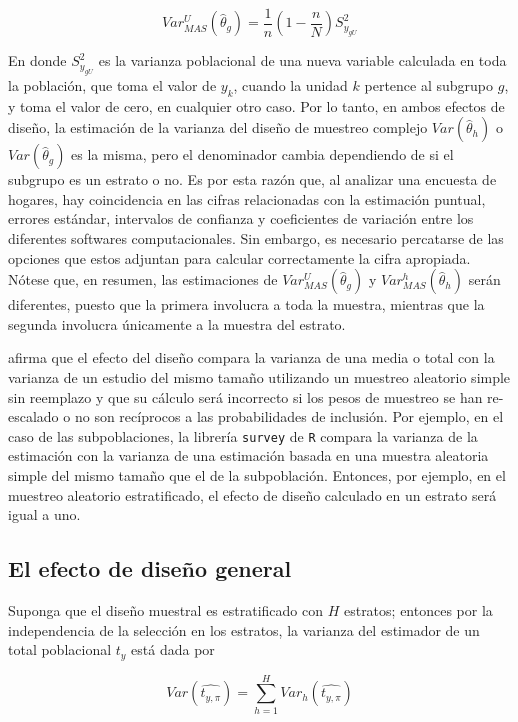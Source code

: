 \documentclass[
  12pt,
]{book}
\begin{document}
\[
Var_{MAS}^U(\hat\theta_g)=\frac{1}{n}\left(1-\frac{n}{N}\right)S^2_{y_{gU}}
\]

En donde \(S^2_{y_{gU}}\) es la varianza poblacional de una nueva variable calculada en toda la población, que toma el valor de \(y_k\), cuando la unidad \(k\) pertence al subgrupo \(g\), y toma el valor de cero, en cualquier otro caso. Por lo tanto, en ambos efectos de diseño, la estimación de la varianza del diseño de muestreo complejo \(Var (\hat\theta_h)\) o \(Var (\hat\theta_g)\) es la misma, pero el denominador cambia dependiendo de si el subgrupo es un estrato o no. Es por esta razón que, al analizar una encuesta de hogares, hay coincidencia en las cifras relacionadas con la estimación puntual, errores estándar, intervalos de confianza y coeficientes de variación entre los diferentes softwares computacionales. Sin embargo, es necesario percatarse de las opciones que estos adjuntan para calcular correctamente la cifra apropiada. Nótese que, en resumen, las estimaciones de \(Var_{MAS}^U(\hat\theta_g)\) y \(Var_{MAS}^h(\hat\theta_h)\) serán diferentes, puesto que la primera involucra a toda la muestra, mientras que la segunda involucra únicamente a la muestra del estrato.

\citet{Lumley_2010} afirma que el efecto del diseño compara la varianza de una media o total con la varianza de un estudio del mismo tamaño utilizando un muestreo aleatorio simple sin reemplazo y que su cálculo será incorrecto si los pesos de muestreo se han re-escalado o no son recíprocos a las probabilidades de inclusión. Por ejemplo, en el caso de las subpoblaciones, la librería \texttt{survey} de \texttt{R} compara la varianza de la estimación con la varianza de una estimación basada en una muestra aleatoria simple del mismo tamaño que el de la subpoblación. Entonces, por ejemplo, en el muestreo aleatorio estratificado, el efecto de diseño calculado en un estrato será igual a uno.

\hypertarget{el-efecto-de-diseuxf1o-general}{%
\subsection{El efecto de diseño general}\label{el-efecto-de-diseuxf1o-general}}

Suponga que el diseño muestral es estratificado con \(H\) estratos; entonces por la independencia de la selección en los estratos, la varianza del estimador de un total poblacional \(t_y\) está dada por

\[
Var\left(\widehat{t_{y,\pi}}\right)=\sum_{h=1}^{H}Var_h\left(\widehat{t_{y,\pi}}\right)
\]
\end{document}
